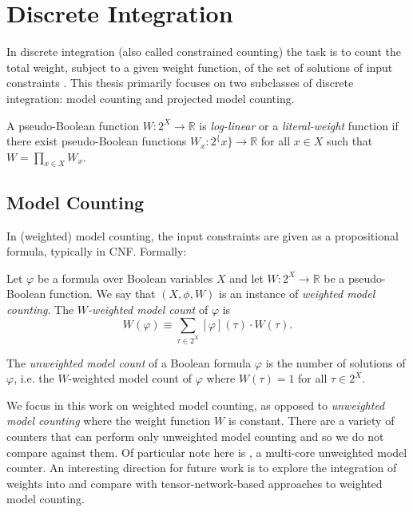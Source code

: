 \section{Discrete Integration}
\label{sec:wmc}

In discrete integration (also called constrained counting) the task is to count the total weight, subject to a given weight function, of the set of solutions of input constraints \cite{GSS08}. This thesis primarily focuses on two subclasses of discrete integration: model counting and projected model counting.

A pseudo-Boolean function $W: 2^X \rightarrow \mathbb{R}$ is \emph{log-linear} or a \emph{literal-weight} function if there exist pseudo-Boolean functions $W_x: 2^\{x\} \rightarrow \mathbb{R}$ for all $x \in X$ such that $W = \prod_{x \in X} W_x$. 


\subsection{Model Counting}
In (weighted) model counting, the input constraints are given as a propositional formula, typically in CNF. Formally:
\begin{definition}
  Let $\varphi$ be a formula over Boolean variables $X$ and let $W: 2^X \rightarrow \mathbb{R}$ be a pseudo-Boolean function. We say that $(X, \phi, W)$ is an instance of \emph{weighted model counting}. The \emph{$W$-weighted model count} of $\varphi$ is
  $$W(\varphi) \equiv \sum_{\tau \in 2^X} [\varphi](\tau) \cdot W(\tau).$$
\end{definition}

The \emph{unweighted model count} of a Boolean formula $\varphi$ is the number of solutions of $\varphi$, i.e. the $W$-weighted model count of $\varphi$ where $W(\tau) = 1$ for all $\tau \in 2^X$.


We focus in this work on weighted model counting, as opposed to \emph{unweighted model counting} where the weight function $W$ is constant. There are a variety of counters \cite{CW16,FHMW17,Thurley2006} that can perform only unweighted model counting and so we do not compare against them. Of particular note here is  \cite{BSB15}, a multi-core unweighted model counter. An interesting direction for future work is to explore the integration of weights into  and compare with tensor-network-based approaches to weighted model counting.

